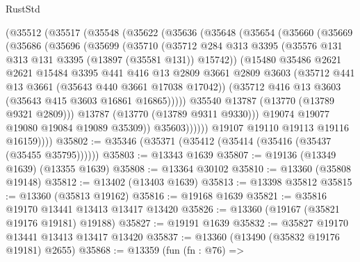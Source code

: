 \begin{lexlean}{RustStd}
\begin{coremodule}
          (@35512
            (@35517
              (@35548
                (@35622
                  (@35636
                    (@35648
                      (@35654
                        (@35660
                          (@35669
                            (@35686
                              (@35696
                                (@35699
                                  (@35710
                                    (@35712
                                      @284
                                      @313
                                      @3395
                                      (@35576 @131 @313 @131 @3395 (@13897 (@35581 @131)) @15742))
                                    (@15480
                                      @35486
                                      @2621
                                      @2621
                                      @15484
                                      @3395
                                      @441
                                      @416
                                      @13
                                      @2809
                                      @3661
                                      @2809
                                      @3603
                                      (@35712 @441 @13 @3661 (@35643 @440 @3661 @17038 @17042))
                                      (@35712 @416 @13 @3603 (@35643 @415 @3603 @16861 @16865)))))
                                @35540
                                @13787
                                (@13770 (@13789 @9321 @2809)))
                              @13787
                              (@13770 (@13789 @9311 @9330)))
                            @19074
                            @19077
                            @19080
                            @19084
                            @19089
                            @35309))
                        @35603))))))
            @19107
            @19110
            @19113
            @19116
            @16159))))
@35802 := @35346 (@35371 (@35412 (@35414 (@35416 (@35437 (@35455 @35795))))))
@35803 := @13343 @1639
@35807 := @19136 (@13349 @1639) (@13355 @1639)
@35808 := @13364 @30102
@35810 := @13360 (@35808 @19148)
@35812 := @13402 (@13403 @1639)
@35813 := @13398 @35812
@35815 := @13360 (@35813 @19162)
@35816 := @19168 @1639
@35821 := @35816 @19170 @13441 @13413 @13417 @13420
@35826 := @13360 (@19167 (@35821 @19176 @19181) @19188)
@35827 := @19191 @1639
@35832 := @35827 @19170 @13441 @13413 @13417 @13420
@35837 := @13360 (@13490 (@35832 @19176 @19181) @2655)
@35868 := @13359
    (fun (fn : @76) =>

\end{coremodule}
\end{lexlean}
